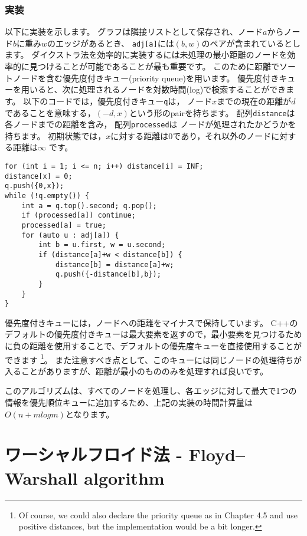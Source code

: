 \subsubsection{実装}

以下に実装を示します。
グラフは隣接リストとして保存され、ノード$a$からノード$b$に重み$w$のエッジがあるとき、 \texttt{adj[a]}には$(b, w)$のペアが含まれているとします。
ダイクストラ法を効率的に実装するには未処理の最小距離のノードを効率的に見つけることが可能であることが最も重要です。
このために距離でソートノードを含む優先度付きキュー(priority queue)を用います。
優先度付きキューを用いると、次に処理されるノードを対数時間(log)で検索することができます。
以下のコードでは，優先度付きキュー\texttt{q}は，
ノード$x$までの現在の距離が$d$であることを意味する，$(-d, x)$という形のpairを持ちます。
配列\texttt{distance}は
各ノードまでの距離を含み，
配列\texttt{processed}は
ノードが処理されたかどうかを持ちます。
初期状態では，$x$に対する距離は0であり，それ以外のノードに対する距離は$\infty$ です。
\begin{lstlisting}
for (int i = 1; i <= n; i++) distance[i] = INF;
distance[x] = 0;
q.push({0,x});
while (!q.empty()) {
    int a = q.top().second; q.pop();
    if (processed[a]) continue;
    processed[a] = true;
    for (auto u : adj[a]) {
        int b = u.first, w = u.second;
        if (distance[a]+w < distance[b]) {
            distance[b] = distance[a]+w;
            q.push({-distance[b],b});
        }
    }
}
\end{lstlisting}


優先度付きキューには，ノードへの距離をマイナスで保持しています。
C++のデフォルトの優先度付きキューは最大要素を返すので，最小要素を見つけるために負の距離を使用することで、デフォルトの優先度キューを直接使用することができます
\footnote{Of
course, we could also declare the priority queue as in Chapter 4.5
and use positive distances, but the implementation would be a bit longer.}。
また注意すべき点として、このキューには同じノードの処理待ちが入ることがありますが、距離が最小のもののみを処理すれば良いです。

このアルゴリズムは、すべてのノードを処理し、各エッジに対して最大で1つの情報を優先順位キューに追加するため、上記の実装の時間計算量は$O(n + m log m)$となります。

\section{ワーシャルフロイド法 - Floyd–Warshall algorithm}


